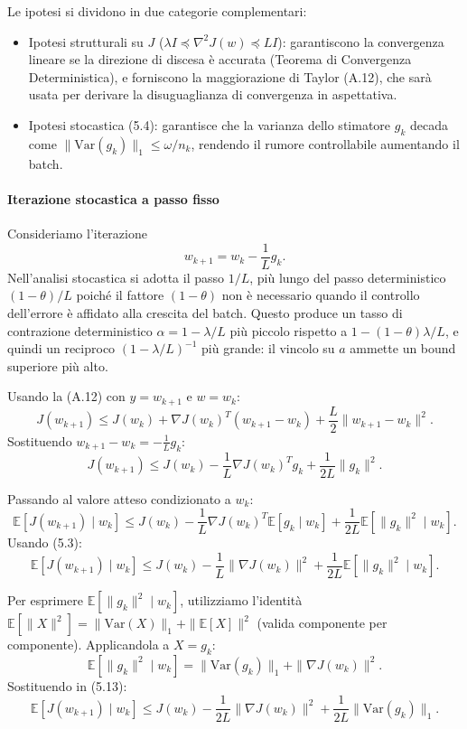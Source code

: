 \documentclass[italian, a4paper, twoside, binding=6mm]{sapthesis}
\begin{document}
Le ipotesi si dividono in due categorie complementari:
\begin{itemize}
    \item Ipotesi strutturali su \(J\) (\(\lambda I \preceq \nabla^2 J(w) \preceq LI\)): garantiscono la convergenza lineare se la direzione di discesa è accurata (Teorema di Convergenza Deterministica), e forniscono la maggiorazione di Taylor (A.12), che sarà usata per derivare la disuguaglianza di convergenza in aspettativa.
    \item Ipotesi stocastica (5.4): garantisce che la varianza dello stimatore \(g_k\) decada come \(\|\mathrm{Var}(g_k)\|_1 \le \omega/n_k\), rendendo il rumore controllabile aumentando il batch.
\end{itemize}

\paragraph{Iterazione stocastica a passo fisso}

Consideriamo l'iterazione
\[
w_{k+1} = w_k - \frac{1}{L} g_k. \tag{5.10}
\]
Nell'analisi stocastica si adotta il passo $1/L$, più lungo del passo deterministico $(1-\theta)/L$ poiché il fattore $(1-\theta)$ non è necessario quando il controllo dell'errore è affidato alla crescita del batch. Questo produce un tasso di contrazione deterministico $\alpha = 1-\lambda/L$ più piccolo rispetto a $1-(1-\theta)\lambda/L$, e quindi un reciproco $(1-\lambda/L)^{-1}$ più grande: il vincolo su $a$ ammette un bound superiore più alto.

Usando la (A.12) con \(y = w_{k+1}\) e \(w = w_k\):
\[
J(w_{k+1}) \le J(w_k) + \nabla J(w_k)^T (w_{k+1} - w_k) + \frac{L}{2}\|w_{k+1} - w_k\|^2. \tag{5.11}
\]
Sostituendo \(w_{k+1} - w_k = -\frac{1}{L}g_k\):
\[
J(w_{k+1}) \le J(w_k) - \frac{1}{L}\nabla J(w_k)^T g_k + \frac{1}{2L}\|g_k\|^2. \tag{5.12}
\]

Passando al valore atteso condizionato a \(w_k\):
\[
\mathbb{E}[J(w_{k+1}) \mid w_k] \le J(w_k) - \frac{1}{L}\nabla J(w_k)^T \mathbb{E}[g_k \mid w_k] + \frac{1}{2L}\mathbb{E}[\|g_k\|^2 \mid w_k].
\]
Usando (5.3):
\[
\mathbb{E}[J(w_{k+1}) \mid w_k] \le J(w_k) - \frac{1}{L}\|\nabla J(w_k)\|^2 + \frac{1}{2L}\mathbb{E}[\|g_k\|^2 \mid w_k]. \tag{5.13}
\]

Per esprimere \(\mathbb{E}[\|g_k\|^2 \mid w_k]\), utilizziamo l'identità \(\mathbb{E}[\|X\|^2] = \|\mathrm{Var}(X)\|_1 + \|\mathbb{E}[X]\|^2\) (valida componente per componente). Applicandola a \(X = g_k\):
\[
\mathbb{E}[\|g_k\|^2 \mid w_k] = \|\mathrm{Var}(g_k)\|_1 + \|\nabla J(w_k)\|^2. \tag{5.14}
\]
Sostituendo in (5.13):
\[
\mathbb{E}[J(w_{k+1}) \mid w_k] \le J(w_k) - \frac{1}{2L}\|\nabla J(w_k)\|^2 + \frac{1}{2L}\|\mathrm{Var}(g_k)\|_1. \tag{5.15}
\]
\end{document}
